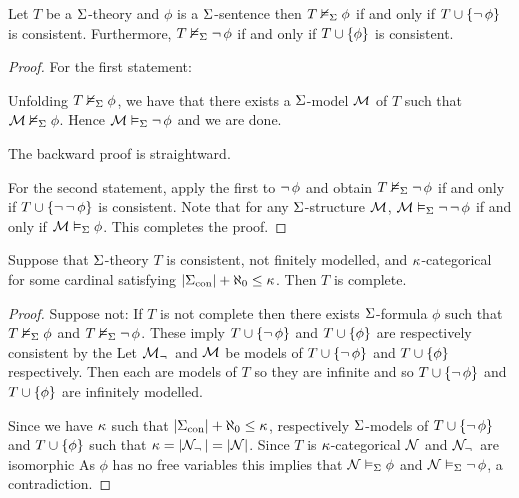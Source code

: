 \begin{prop}
    Let $T$ be a $\Sigma$-theory
    and $\phi$ is a $\Sigma$-sentence
    then $T \nvDash_{\Sigma} \phi$
    if and only if $T \cup \left\{ \neg\, \phi\right\}$ is consistent.
    Furthermore, $T \nvDash_{\Sigma} \neg\, \phi$
    if and only if $T \cup \left\{\phi\right\}$ is consistent.
\end{prop}
\begin{proof}
    For the first statement:
    \begin{forward}
        Unfolding $T \nvDash_{\Sigma} \phi$,
        we have that there exists a $\Sigma$-model $\mathcal{M}$ of $T$ 
        such that $\mathcal{M} \nvDash_{\Sigma} \phi$.
        Hence $\mathcal{M} \vDash_{\Sigma} \neg\, \phi$ and we are done.
    \end{forward}
    The backward proof is straightward.

    For the second statement, 
    apply the first to $\neg\, \phi$ and obtain 
    $T \nvDash_{\Sigma} \neg\, \phi$
    if and only if $T \cup \left\{\neg\, \neg\, \phi\right\}$ is consistent.
    Note that for any $\Sigma$-structure $\mathcal{M}$, 
    $\mathcal{M} \vDash_{\Sigma} \neg\, \neg\, \phi$ 
    if and only if $\mathcal{M} \vDash_{\Sigma} \phi$.
    This completes the proof.
\end{proof}

\begin{prop}
    Suppose that $\Sigma$-theory $T$ is consistent, 
    not finitely modelled, and $\kappa$-categorical 
    for some cardinal satisfying 
    $|{\Sigma}_\mathrm{con}| + \aleph_0 \leq \kappa$.
    Then $T$ is complete.
\end{prop}
\begin{proof}
    Suppose not: If $T$ is not complete then there exists
    $\Sigma$-formula $\phi$ such that $T \nvDash_{\Sigma} \phi$ and 
    $T \nvDash_{\Sigma} \neg\, \phi$.
    These imply $T \cup \left\{\neg\, \phi\right\}$
    and $T \cup \left\{\phi\right\}$ are respectively consistent by the 
    Let $\mathcal{M}_\neg\,$ and $\mathcal{M}$ be models of  
    $T \cup \left\{\neg\, \phi\right\}$ and $T \cup \left\{\phi\right\}$
    respectively.
    Then each are models of $T$ so they are infinite
    and so $T \cup \left\{\neg\, \phi\right\}$ and $T \cup \left\{\phi\right\}$
    are infinitely modelled.

    Since we have $\kappa$ such that $|{\Sigma}_\mathrm{con}| + \aleph_0 \leq \kappa$, 
     respectively $\Sigma$-models of 
        $T \cup \left\{\neg\, \phi\right\}$ and $T \cup \left\{\phi\right\}$
        such that 
        $\kappa = |{\mathcal{N}_\neg\,}| = |{\mathcal{N}}|$.
    Since $T$ is $\kappa$-categorical
    $\mathcal{N}$ and $\mathcal{N}_\neg\,$ are isomorphic
    As $\phi$ has no free variables this implies that
    $\mathcal{N} \vDash_{\Sigma} \phi$ and $\mathcal{N} \vDash_{\Sigma} \neg\, \phi$, 
    a contradiction.
\end{proof}

